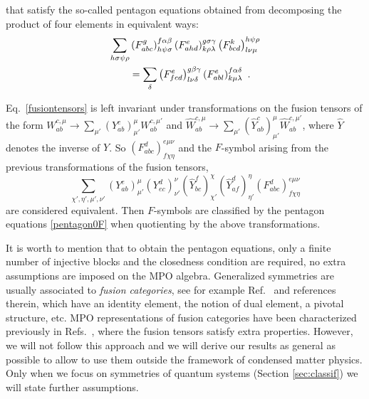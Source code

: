 \documentclass[a4paper,twocolumn,11pt,accepted=2023-02-10]{quantumarticle}
\begin{document}
that satisfy the so-called pentagon equations obtained from decomposing the product of four elements in equivalent ways:
\begin{align}\label{pentagon0F}
 \sum_{h\sigma\psi\rho} & \left( {F}_{abc}^g\right)_{h\psi\sigma}^{f\alpha\beta} \left( {F}_{ahd}^e\right)_{k\rho\lambda}^{g\sigma\gamma} \left( {F}_{bcd}^k\right)_{l\nu\mu}^{h\psi\rho} \notag \\
   & =  \sum_\delta \left( {F}_{fcd}^e\right)_{l\nu\delta}^{g\beta \gamma} \left( {F}_{abl}^e\right)_{k\mu\lambda}^{f\alpha\delta} \ .
\end{align}

Eq.\ \eqref{fusiontensors} is left invariant under transformations on the fusion tensors of the form $ {W}_{ab}^{c,\mu}  \to \sum_{\mu'} \left(Y_{ab}^c \right)_{\mu'}^\mu{W}_{a b}^{c,\mu'} $ and  $\hat{W}_{a b}^{c, \mu} \to \sum_{\mu'} {\left( {\hat{Y}_{a b}^c} \right)_{\mu'}^\mu} \hat{W}_{a b}^{c,\mu' }$, where $\hat{Y}$ denotes the inverse of $Y$. So $ \left({F}_{a b c}^d\right)_{f\chi\eta}^{e \mu \nu}$ and the ${F}$-symbol arising from the previous transformations of the fusion tensors,
 $$ \sum_{\chi',\eta',\mu',\nu'}
  \left(Y_{ab}^e \right)_{\mu'}^\mu
  \left(Y_{e c}^d \right)_{\nu'}^\nu  
     \left({\hat{Y}_{b c}^f}\right)_{\chi'}^\chi
        \left({\hat{Y}_{a f}^d}\right)_{\eta'}^\eta
  \left({F}_{a b c}^d\right)_{f\chi\eta}^{e \mu \nu} 
$$
are considered equivalent. Then ${F}$-symbols are classified by the pentagon equations \eqref{pentagon0F} when quotienting by the above transformations.

It is worth to mention that to obtain the pentagon equations, only a finite number of injective blocks and the closedness condition are required, no extra assumptions are imposed on the MPO algebra. Generalized symmetries are usually associated to {\it fusion categories}, see for example Ref.\ \cite{Thorngren19} and references therein, which have an identity element, the notion of dual element, a pivotal structure, etc. MPO representations of fusion categories have been characterized previously in Refs.\ \cite{Bultinck17A, Lootens21A}, where the fusion tensors satisfy extra properties. However, we will not follow this approach and we will derive our results as general as possible to allow to use them outside the framework of condensed matter physics. Only when we focus on symmetries of quantum systems (Section \ref{sec:classif}) we will state further assumptions. 
\end{document}
